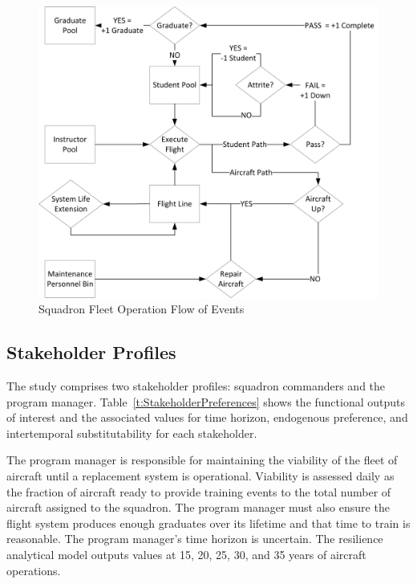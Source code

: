 \documentclass[preprint,12pt]{elsarticle}
\begin{document}
\begin{figure}[h]
  \centering\includegraphics[width=5in]{DESflow.png}
  \caption{Squadron Fleet Operation Flow of Events}
% 
% 
  \label{f:DESflow}
\end{figure}



\subsection{Stakeholder Profiles}

The study comprises two stakeholder profiles: squadron
commanders and the program manager. Table~\ref{t:StakeholderPreferences}
shows the functional outputs of interest and the associated values for
time horizon, endogenous preference, and intertemporal
substitutability for each stakeholder.

The program manager is responsible for maintaining the
viability of the fleet of aircraft until a replacement system is
operational. Viability is assessed daily as the fraction of 
aircraft ready to provide training events to the total number of aircraft
assigned to the squadron. The program manager must also ensure the flight system
produces enough graduates over its lifetime and that time to train is
reasonable. The program manager's time horizon is uncertain. The
resilience analytical model outputs values at 15, 20, 25, 30, and 35
years of aircraft operations.  
\end{document}
